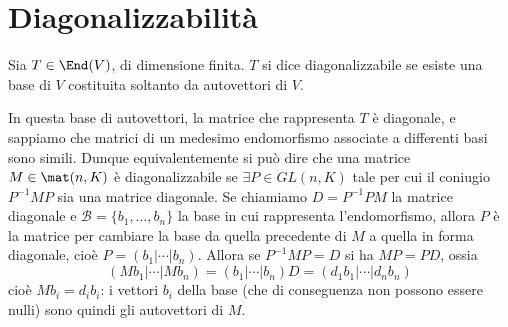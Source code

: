 \section{Diagonalizzabilità}
\begin{definizione}\label{d:endomorfismo-diagonalizzabile}
	Sia $T\in\End(V)$, di dimensione finita.
	$T$ si dice diagonalizzabile se esiste una base di $V$ costituita soltanto da autovettori di $V$.
\end{definizione}
In questa base di autovettori, la matrice che rappresenta $T$ è diagonale, e sappiamo che matrici di un medesimo endomorfismo associate a differenti basi sono simili.
Dunque equivalentemente si può dire che una matrice $M\in\mat(n,K)$ è diagonalizzabile se $\exists P\in GL(n,K)$ tale per cui il coniugio $P^{-1}MP$ sia una matrice diagonale.
Se chiamiamo $D=P^{-1}PM$ la matrice diagonale e $\mathcal B=\{b_1,\dots,b_n\}$ la base in cui rappresenta l'endomorfismo, allora $P$ è la matrice per cambiare la base da quella precedente di $M$ a quella in forma diagonale, cioè $P=(b_1|\cdots|b_n)$.
Allora se $P^{-1}MP=D$ si ha $MP=PD$, ossia
\begin{equation*}
	(Mb_1|\cdots|Mb_n)=(b_1|\cdots|b_n)D=(d_1b_1|\cdots|d_nb_n)
\end{equation*}
cioè $Mb_i=d_ib_i$: i vettori $b_i$ della base (che di conseguenza non possono essere nulli) sono quindi gli autovettori di $M$.

